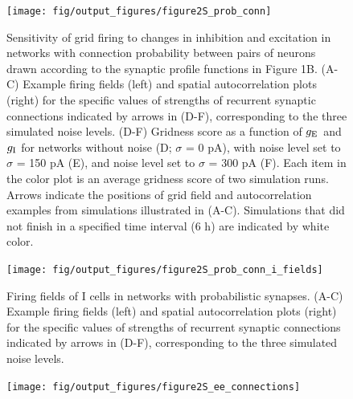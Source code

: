 \documentclass[a4paper,12pt]{article}
\newcommand{\ssc}[3]{\ensuremath{#1_{\text{#2}_{\text{#3}}}}}
\newcommand{\gE      }{\ssc{g}      {\scriptsize{E}}{}}
\newcommand{\gI      }{\ssc{g}      {\scriptsize{I}}{}}
\begin{document}
\begin{figure}[p]
    \internallinenumbers
    \centering
        \texttt{[image: fig/output\_figures/figure2S\_prob\_conn]}
    \caption{Sensitivity of grid firing to changes in inhibition and excitation
    in networks with connection probability between pairs of neurons drawn
    according to the synaptic profile functions in Figure 1B. (A-C) Example
    firing fields (left) and spatial autocorrelation plots (right) for the
    specific values of strengths of recurrent synaptic connections indicated by
    arrows in (D-F), corresponding to the three simulated noise levels.  (D-F)
    Gridness score as a function of $\gE$ and $\gI$ for networks without noise (D;
    $\sigma$ = 0 pA), with noise level set to $\sigma$ = 150 pA (E), and noise
    level set to $\sigma$ = 300 pA (F). Each item in the color plot is an
    average gridness score of two simulation runs. Arrows indicate the
    positions of grid field and autocorrelation examples from simulations
    illustrated in (A-C). Simulations that did not finish in a specified time
    interval (6 h) are indicated by white color.}
\end{figure}

\clearpage

\begin{figure}[p]
    \internallinenumbers
    \centering
        \texttt{[image: fig/output\_figures/figure2S\_prob\_conn\_i\_fields]}
    \caption{Firing fields of I cells in networks with probabilistic synapses.
    (A-C) Example firing fields (left) and spatial autocorrelation plots
    (right) for the specific values of strengths of recurrent synaptic
    connections indicated by arrows in (D-F), corresponding to the three
    simulated noise levels.
    }
\end{figure}

\clearpage

%

\begin{figure}[p]
    \internallinenumbers
    \centering
        \texttt{[image: fig/output\_figures/figure2S\_ee\_connections]}
    \caption{}
\end{figure}
\end{document}
